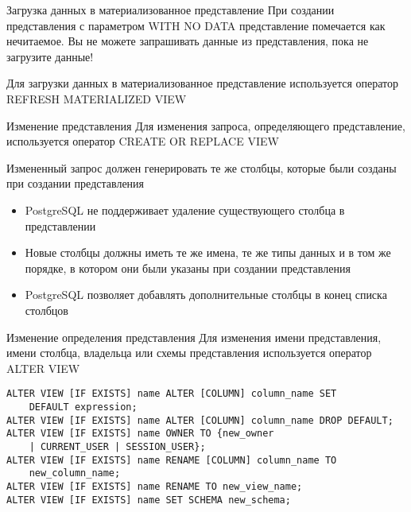 \documentclass[12pt]{article}
\begin{document}
\begin{nota}{Загрузка данных в материализованное представление}
    При создании представления с параметром WITH NO DATA представление помечается как нечитаемое. Вы не можете запрашивать данные из представления, пока не загрузите данные! 

    Для загрузки данных в материализованное представление используется оператор REFRESH MATERIALIZED VIEW
\end{nota}

\begin{nota}{Изменение представления}
    Для изменения запроса, определяющего представление, используется оператор CREATE OR REPLACE VIEW 

    Измененный запрос должен генерировать те же столбцы, которые были созданы при создании представления

    \begin{itemize}
        \item PostgreSQL не поддерживает удаление существующего столбца в представлении
        \item Новые столбцы должны иметь те же имена, те же типы данных и в том же порядке, в котором они были указаны при создании представления
        \item PostgreSQL позволяет добавлять дополнительные столбцы в конец списка столбцов 
    \end{itemize}
\end{nota}

\begin{nota}{Изменение определения представления}
    Для изменения имени представления, имени столбца, владельца или схемы представления используется оператор ALTER VIEW

\begin{lstlisting}
ALTER VIEW [IF EXISTS] name ALTER [COLUMN] column_name SET 
    DEFAULT expression;
ALTER VIEW [IF EXISTS] name ALTER [COLUMN] column_name DROP DEFAULT;
ALTER VIEW [IF EXISTS] name OWNER TO {new_owner 
    | CURRENT_USER | SESSION_USER};
ALTER VIEW [IF EXISTS] name RENAME [COLUMN] column_name TO 
    new_column_name;
ALTER VIEW [IF EXISTS] name RENAME TO new_view_name;
ALTER VIEW [IF EXISTS] name SET SCHEMA new_schema;
\end{lstlisting}
\end{nota}
\end{document}
